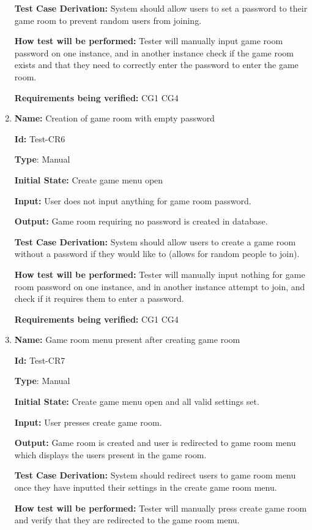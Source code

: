 \documentclass[12pt, titlepage]{article}
\begin{document}
\begin{enumerate}
\textbf{Test Case Derivation:} System should allow users to set a password to their game room to prevent random users from joining.

\textbf{How test will be performed:} Tester will manually input game room password on one instance, and in another instance check if the game room exists and that they need to correctly enter the password to enter the game room. 

\textbf{Requirements being verified: }CG1 CG4

\item{\textbf{Name:} Creation of game room with empty password}

\textbf{Id:} Test-CR6

\textbf{Type}: Manual

\textbf{Initial State:} Create game menu open

\textbf{Input:} User does not input anything for game room password.

\textbf{Output:} Game room requiring no password is created in database.

\textbf{Test Case Derivation:} System should allow users to create a game room without a password if they would like to (allows for random people to join).

\textbf{How test will be performed:} Tester will manually input nothing for game room password on one instance, and in another instance attempt to join, and check if it requires them to enter a password.

\textbf{Requirements being verified: }CG1 CG4

\item{\textbf{Name:} Game room menu present after creating game room}

\textbf{Id:} Test-CR7

\textbf{Type}: Manual
					
\textbf{Initial State:} Create game menu open and all valid settings set.
					
\textbf{Input:} User presses create game room.
					
\textbf{Output:} Game room is created and user is redirected to game room menu which displays the users present in the game room.

\textbf{Test Case Derivation:} System should redirect users to game room menu once they have inputted their settings in the create game room menu.
					
\textbf{How test will be performed:} Tester will manually press create game room and verify that they are redirected to the game room menu.


\end{enumerate}
\end{document}
